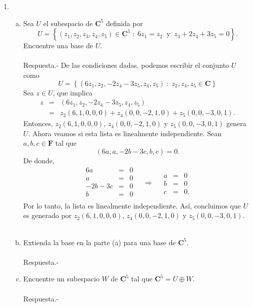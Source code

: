 \begin{enumerate}[\bfseries 1.]
\begin{enumerate}[a).]
	\end{enumerate}

    \item 
	\begin{enumerate}[(a)]

	    \item Sea $U$ el subespacio de $\textbf{C}^5$ definida por 
	    $$U=\left\{(z_1,z_2,z_3,z_4,z_5)\in \textbf{C}^5\; :\; 6z_1=z_2\;\; \mbox{y}\;\; z_3+2z_4+3z_5=0\right\}.$$
	    Encuentre una base de $U$.\\\\
		Respuesta.-\; De las condiciones dadas, podemos escribir el conjunto $U$ como
		$$U=\left\{(6z_1,z_2,-2z_4-3z_5,z_4,z_5)\;:\;z_2,z_4,z_5\in \textbf{C}\right\}$$
		Sea $z\in U$, que implica
		$$
		\begin{array}{rcl}
		    z &=& (6z_1,z_2,-2z_4-3z_5,z_4,z_5)\\
		      &=& z_2(6,1,0,0,0)+z_4(0,0,-2,1,0)+z_5(0,0,-3,0,1).
		\end{array}
		$$
		Entonces, $z_2(6,1,0,0,0)$, $z_4(0,0,-2,1,0)$ y $z_5(0,0,-3,0,1)$ genera $U$. Ahora veamos si esta lista es linealmente independiente. Sean $a,b,c\in \textbf{F}$ tal que 
		$$(6a,a,-2b-3c,b,c)=0.$$
		De donde,
		$$
		\begin{array}{rcl}
		    6a&=&0\\
		    a&=&0\\
		    -2b-3c&=&0\\
		    b&=&0\\
		\end{array}
		\quad \Rightarrow \quad 
		\begin{array}{rcl}
		    a&=&0\\
		    b&=&0\\
		    c&=&0.
		\end{array}
		$$
		Por lo tanto, la lista es linealmente independiente. Así, concluimos que $U$ es generado por $z_2(6,1,0,0,0)$, $z_4(0,0,-2,1,0)$ y $z_5(0,0,-3,0,1)$.\\\\

	    \item Extienda la base en la parte (a) para una base de $\textbf{C}^5$.\\\\
		Respuesta.-\;

	    \item Encuentre un subespacio $W$ de $\textbf{C}^5$ tal que $\textbf{C}^5=U\oplus W$.\\\\
		Respuesta.-\; 


\end{enumerate}
\end{enumerate}
